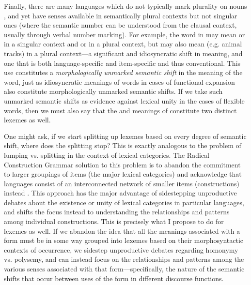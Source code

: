 Finally, there are many languages which do not typically mark plurality on nouns \parencite{Dryer2013}, and yet have senses available in semantically plural contexts but not singular ones (where the semantic number can be understood from the clausal context, usually through verbal number marking). For example, the word  in  may mean  or  in a singular context and  or  in a plural context, but may also mean  (e.g. animal tracks) in a plural context—a significant and idiosyncratic shift in meaning, and one that is both language-specific and item-specific and thus conventional. This use constitutes a \emph{morphologically unmarked semantic shift} in the meaning of the word, just as idiosyncratic meanings of words in cases of functional expansion also constitute morphologically unmarked semantic shifts. If we take such unmarked semantic shifts as evidence against lexical unity in the cases of flexible words, then we must also say that the  and  meanings of  constitute two distinct lexemes as well.

One might ask, if we start splitting up lexemes based on every degree of semantic shift, where does the splitting stop? This is exactly analogous to the problem of lumping vs. splitting in the context of lexical categories. The Radical Construction Grammar solution to this problem is to abandon the commitment to larger groupings of items (the major lexical categories) and acknowledge that languages consist of an interconnected network of smaller items (constructions) instead \parencite{Croft2001b}. This approach has the major advantage of sidestepping unproductive debates about the existence or unity of lexical categories in particular languages, and shifts the focus instead to understanding the relationships and patterns among individual constructions. This is precisely what I propose to do for lexemes as well. If we abandon the idea that all the meanings associated with a form must be in some way grouped into lexemes based on their morphosyntactic contexts of occurrence, we sidestep unproductive debates regarding homonymy vs. polysemy, and can instead focus on the relationships and patterns among the various senses associated with that form—specifically, the nature of the semantic shifts that occur between uses of the form in different discourse functions.

